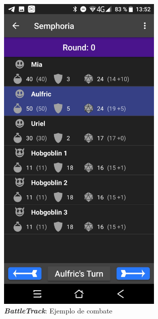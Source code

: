 \begin{figure}[H]
\begin{minipage}{0.3\textwidth}
    \end{minipage} \hspace{2cm}
    \begin{minipage}{0.3\textwidth}
        \centering
        \includegraphics[width=0.7\textwidth]{Images/BattleTrack_2.jpeg}
        \caption{\textit{\textbf{BattleTrack}}: Ejemplo de combate}
        
    \end{minipage}
\end{figure}
\vspace{1cm}


